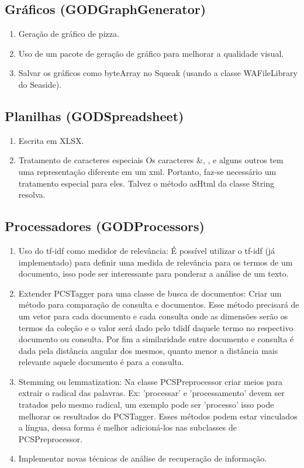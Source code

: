 \subsection{Gráficos (GODGraphGenerator)}
\begin{enumerate}
\item Geração de gráfico de pizza.
\item Uso de um pacote de geração de gráfico para melhorar a qualidade visual.
\item Salvar os gráficos como byteArray no Squeak (usando a classe WAFileLibrary do Seaside).
\end{enumerate}

\subsection{Planilhas (GODSpreadsheet)}
\begin{enumerate}
\item Escrita em XLSX.
\item  Tratamento de caracteres especiais Os caracteres \&, \>, \< e alguns outros tem uma representação diferente em um xml. Portanto, faz-se necessário um tratamento especial para eles. Talvez o método asHtml da classe String resolva.
\end{enumerate}

\subsection{Processadores (GODProcessors)}
\begin{enumerate}
\item Uso do tf-idf como medidor de relevância: É possível utilizar o tf-idf (já implementado) para definir uma medida de relevância para os termos de um documento, isso pode ser interessante para ponderar a análise de um texto.
\item Extender PCSTagger para uma classe de busca de documentos: Criar um método para comparação de consulta e documentos. Esse método precisará de um vetor para cada documento e cada consulta onde as dimensões serão os termos da coleção e o valor será dado pelo tdidf daquele termo no respectivo documento ou consulta. Por fim a similaridade entre documento e consulta é dada pela distância angular dos mesmos, quanto menor a distância mais relevante aquele documento é para a consulta.
\item Stemming ou lemmatization: Na classe PCSPreprocessor criar meios para extrair o radical das palavras. Ex: 'processar' e 'processamento' devem ser tratados pelo mesmo radical, um exemplo pode ser 'processo' isso pode melhorar os resultados do PCSTagger. Esses métodos podem estar vinculados a língua, dessa forma é melhor adicioná-los nas subclasses de PCSPreprocessor.
\item Implementar novas técnicas de análise de recuperação de informação.
\end{enumerate}

